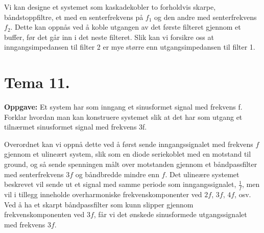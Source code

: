 \documentclass[a4paper,11pt,norsk]{article}
\begin{document}
Vi kan designe et systemet som kaskadekobler to forholdvis skarpe, båndstoppfiltre, et med en senterfrekvens 
på $f_1$ og den andre med senterfrekvens $f_2$. Dette kan oppnås ved å koble utgangen av det første filteret 
gjennom et buffer, før det går inn i det neste filteret. Slik kan vi forsikre oss at inngangsimpedansen til filter 2 er 
mye større enn utgangsimpedansen til filter 1.

\newpage
\section{Tema 11.}
\begin{question}
    \textbf{Oppgave:}
        Et system har som inngang et sinusformet signal med
        frekvens f. Forklar hvordan man kan konstruere systemet
        slik at det har som utgang et tilnærmet sinusformet signal
        med frekvens 3f.
\end{question}

Overordnet kan vi oppnå dette ved å først sende inngangssignalet med frekvens $f$ gjennom et ulineært system, slik som 
en diode seriekoblet med en motstand til ground, og så sende spenningen målt over motstanden 
gjennom et båndpassfilter med senterfrekvens $3f$ og båndbredde mindre enn $f$. Det ulineære systemet beskrevet 
vil sende ut et signal med samme periode som inngangssignalet, $\frac{1}{f}$, men vil i tillegg inneholde overharmoniske frekvenskomponenter 
ved $2f$, $3f$, $4f$, osv. Ved å ha et skarpt båndpassfilter som kunn slipper gjennom frekvenskomponenten ved $3f$, får vi det ønskede 
sinusformede utgangssignalet med frekvens $3f$.

\newpage
\end{document}
